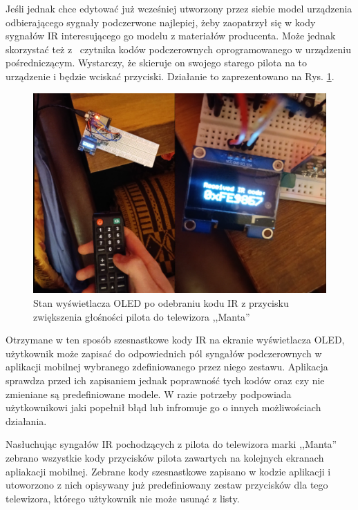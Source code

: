 \documentclass[12pt,twoside]{article}
\begin{document}
Jeśli jednak chce edytować już wcześniej utworzony przez siebie model urządzenia odbierającego sygnały podczerwone najlepiej, żeby zaopatrzył się w kody sygnałów IR interesującego go modelu z materiałów producenta. Może jednak skorzystać też z~ czytnika kodów podczerownych oprogramowanego w urządzeniu pośredniczącym. Wystarczy, że skieruje on swojego starego pilota na to urządzenie i będzie wciskać przyciski. Działanie to zaprezentowano na Rys. \ref*{Fig:irCodeRemote}.

\begin{figure}[ht]
   \centering
   \includegraphics[width=14cm]{images/irCodeRemote.png}
   \caption{Stan wyświetlacza OLED po odebraniu kodu IR z przycisku zwiększenia głośności pilota do telewizora ,,Manta''}
   \label{Fig:irCodeRemote}
\end{figure}

 Otrzymane w ten sposób szesnastkowe kody IR na ekranie wyświetlacza OLED, użytkownik może zapisać do odpowiednich pól syngałów podczerownych w aplikacji mobilnej wybranego zdefiniowanego przez niego zestawu. Aplikacja sprawdza przed ich zapisaniem jednak poprawność tych kodów oraz czy nie zmieniane są predefiniowane modele. W razie potrzeby podpowiada użytkownikowi jaki popełnił błąd lub infromuje go o innych możliwościach działania.

 Nasłuchując syngałów IR pochodzących z pilota do telewizora marki ,,Manta'' zebrano wszystkie kody przycisków pilota zawartych na kolejnych ekranach apliakacji mobilnej. Zebrane kody szesnastkowe zapisano w kodzie aplikacji i utoworzono z nich opisywany już predefiniowany zestaw przycisków dla tego telewizora, którego użtykownik nie może usunąć z listy.
\end{document}
